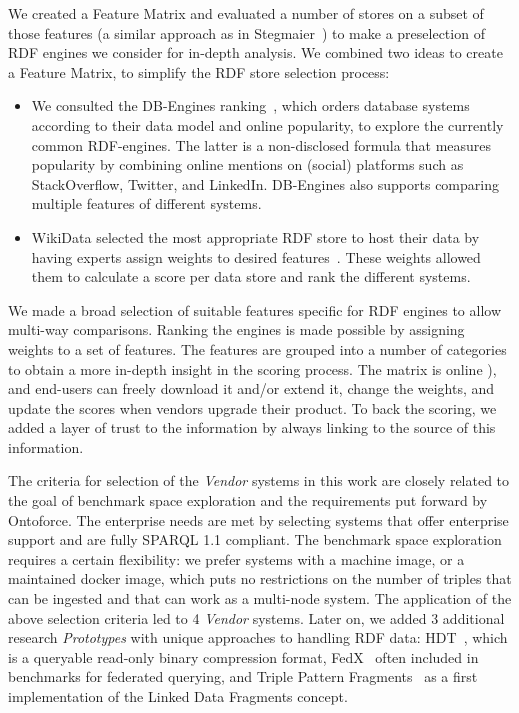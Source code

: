 
We created a Feature Matrix and evaluated a number of stores on a subset of those features (a similar approach as in Stegmaier~\cite{Stegmaier_evaluationof}) to make a preselection of RDF engines we consider for in-depth analysis.
We combined two ideas to create a Feature Matrix, to simplify the RDF store selection process:
\begin{itemize}
\item We consulted the DB-Engines ranking~\cite{dbengines}, which orders database systems according to their data model and online popularity, to explore the currently common 
RDF-engines.
The latter is a non-disclosed formula that measures popularity by combining online mentions on (social) platforms such as StackOverflow, Twitter, and LinkedIn. 
DB-Engines also supports comparing multiple features of different systems.
\item WikiData selected the most appropriate RDF store to host their data by having experts assign weights to desired features~\cite{wikidataranking}.
These weights allowed them to calculate a score per data store and rank the different systems. 
\end{itemize}
We made a broad selection of suitable features specific for RDF engines to allow multi-way comparisons. Ranking the engines is made possible by assigning weights to a set of features. 
The features are grouped into a number of categories to obtain a more in-depth insight in the scoring process. 
The matrix is online ), and end-users can freely download it and/or extend it, change the weights, and update the scores when vendors upgrade their product. 
To back the scoring, we added a layer of trust to the information by always linking to the source of this information.

The criteria for selection of the \emph{Vendor} systems in this work are closely related to the goal of benchmark space exploration and the requirements put forward by Ontoforce. 
The enterprise needs are met by selecting systems that offer enterprise support and are fully SPARQL 1.1 compliant. The benchmark space exploration requires a certain flexibility: we prefer systems with a machine image, or a maintained docker image, which puts no restrictions on the number of triples that can be ingested and that can work as a multi-node system.
The application of the above selection criteria led to 4 \emph{Vendor} systems. 
Later on, we added 3 additional research \emph{Prototypes} with unique approaches to handling RDF data: HDT~\cite{DBLP:journals/ws/FernandezMGPA13}, which is a queryable read-only binary compression format, FedX~\cite{DBLP:conf/semweb/SchwarteHHSS11} often included in benchmarks for federated querying, and Triple Pattern Fragments~\cite{DBLP:conf/semweb/VerborghHMHVSCCMW14} as a first implementation of the Linked Data Fragments concept.

